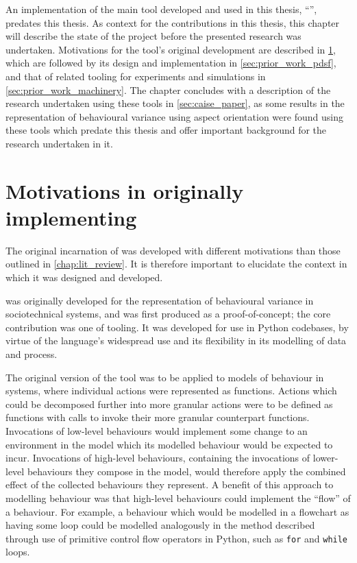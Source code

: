 

An implementation of the main tool developed and used in this thesis, ``\pdsf'',
predates this thesis. As context for the contributions in this thesis, this
chapter will describe the state of the project before the presented research was
undertaken. Motivations for the tool's original development are described in
\cref{sec:pdsf_motivations}, which are followed by its design and implementation
in \cref{sec:prior_work_pdsf}, and that of related tooling for experiments and
simulations in \cref{sec:prior_work_machinery}. The chapter concludes with a
description of the research undertaken using these tools in
\cref{sec:caise_paper}, as some results in the representation of behavioural
variance using aspect orientation were found using these tools which predate
this thesis and offer important background for the research undertaken in it.

\section{Motivations in originally implementing \pdsf}\label{sec:pdsf_motivations}

The original incarnation of \pdsf{} was developed with different motivations
than those outlined in \cref{chap:lit_review}. It is therefore important to
elucidate the context in which it was designed and developed.

\pdsf{} was originally developed for the representation of behavioural variance
in sociotechnical systems, and was first produced as a proof-of-concept; the
core contribution was one of tooling. It was developed for use in Python
codebases, by virtue of the language's widespread use and its flexibility in its
modelling of data and process.

The original version of the tool was to be applied to models of behaviour in
\sociotechnical systems, where individual actions were represented as functions.
Actions which could be decomposed further into more granular actions were to be
defined as functions with calls to invoke their more granular counterpart
functions. Invocations of low-level behaviours would implement some change to an
environment in the model which its modelled behaviour would be expected to
incur. Invocations of high-level behaviours, containing the invocations of
lower-level behaviours they compose in the model, would therefore apply the
combined effect of the collected behaviours they represent. A benefit of this
approach to modelling behaviour was that high-level behaviours could implement
the ``flow'' of a behaviour. For example, a behaviour which would be modelled in
a flowchart as having some loop could be modelled analogously in the method
described through use of primitive control flow operators in Python, such as
\lstinline{for} and \lstinline{while} loops.

